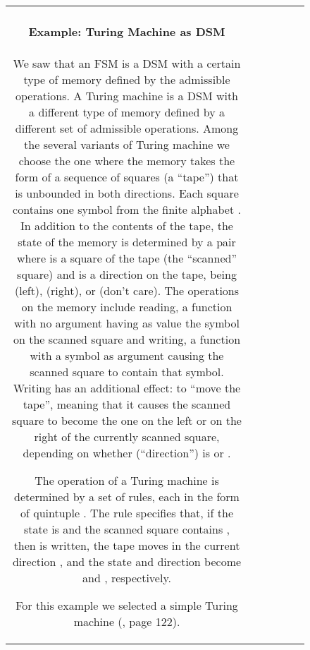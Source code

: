 \documentclass[preprint,11pt]{elsarticle}
\begin{document}
\begin{figure}[htbp]
\begin{center}
\begin{minipage}{4in}
\begin{tabular}{c|c|c|c|c|c}
{\paragraph{Example: Turing Machine as DSM}
We saw that an FSM is a DSM with a certain type of memory
defined by the admissible operations.
A Turing machine is a DSM with a different type of memory
defined by a different set of admissible operations.
Among the several variants of Turing machine
we choose the one where the memory takes the form of
a sequence of squares (a ``tape'') that is unbounded
in both directions.
Each square contains one symbol from the finite alphabet
.
In addition to the contents of the tape,
the state of the memory is determined by a pair 
where  is a square of the tape (the ``scanned'' square) and 
is a direction on the tape, being  (left),  (right),
or  (don't care).
The operations on the memory include reading,
a function with no argument having as value
the symbol on the scanned square and writing,
a function with a symbol as argument
causing the scanned square to contain that symbol.
Writing has an additional effect:
to ``move the tape'',
meaning that it causes the scanned square to become
the one on the left or on the right of the currently scanned square,
depending on whether  (``direction'') is  or .

The operation of a Turing machine is determined by a
set of rules, each in the form of quintuple .
The rule specifies that, if the state is 
and the scanned square contains ,
then  is written, the tape moves in the current
direction , and the state and direction become
 and , respectively.

For this example we selected a simple Turing machine
(\cite{mnsk67}, page 122).

}
\end{tabular}
\end{minipage}
\end{center}
\end{figure}
\end{document}
